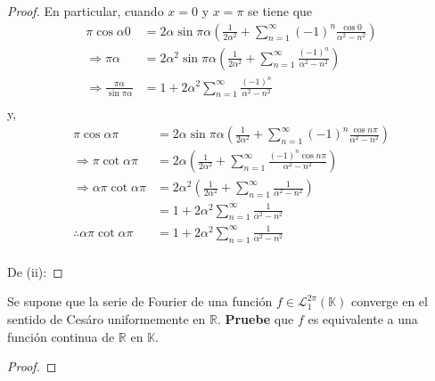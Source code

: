 \documentclass[12pt]{report}
\theoremstyle{largebreak}
\begin{document}
\begin{proof}
        En particular, cuando $x=0$ y $x=\pi$ se tiene que
        \begin{equation*}
            \begin{split}
                \pi\cos \alpha 0&=2\alpha\sin\pi\alpha\left(\frac{1}{2\alpha^2}+\sum_{n=1}^{\infty}(-1)^n\frac{\cos 0}{\alpha^2-n^2}\right)\\
                \Rightarrow \pi\alpha&=2\alpha^2\sin\pi\alpha\left(\frac{1}{2\alpha^2}+\sum_{n=1}^{\infty}\frac{(-1)^n}{\alpha^2-n^2}\right)\\
                \Rightarrow \frac{\pi\alpha}{\sin\pi\alpha}&=1+2\alpha^2\sum_{n=1}^{\infty}\frac{(-1)^n}{\alpha^2-n^2}\\
            \end{split}
        \end{equation*}
        y,
        \begin{equation*}
            \begin{split}
                \pi\cos \alpha\pi&=2\alpha\sin\pi\alpha\left(\frac{1}{2\alpha^2}+\sum_{n=1}^{\infty}(-1)^n\frac{\cos n\pi}{\alpha^2-n^2}\right)\\
                \Rightarrow \pi\cot\alpha\pi&=2\alpha\left(\frac{1}{2\alpha^2}+\sum_{n=1}^{\infty}\frac{(-1)^n\cos n\pi}{\alpha^2-n^2}\right)\\
                \Rightarrow \alpha\pi\cot\alpha\pi&=2\alpha^2\left(\frac{1}{2\alpha^2}+\sum_{n=1}^{\infty}\frac{1}{\alpha^2-n^2}\right)\\
                &=1+2\alpha^2\sum_{n=1}^{\infty}\frac{1}{\alpha^2-n^2}\\
                \therefore\alpha\pi\cot\alpha\pi&=1+2\alpha^2\sum_{n=1}^{\infty}\frac{1}{\alpha^2-n^2}\\
            \end{split}
        \end{equation*}

        De (ii): %
    \end{proof}

    \begin{excer}
        Se supone que la serie de Fourier de una función $f\in\mathcal{L}_1^{2\pi}(\mathbb{K})$ converge en el sentido de Cesáro uniformemente en $\mathbb{R}$. \textbf{Pruebe} que $f$ es equivalente a una función continua de $\mathbb{R}$ en $\mathbb{K}$.
    \end{excer}

    \begin{proof}
    \end{proof}
\end{document}

